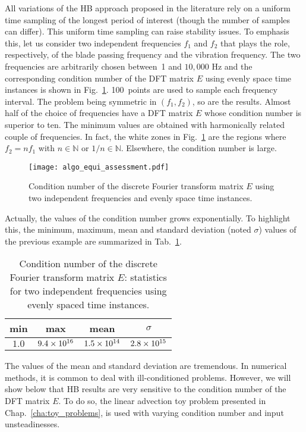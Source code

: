 All variations of the HB approach proposed in the literature rely on 
a uniform time sampling of the longest period of interest 
(though the number of samples can differ). 
This uniform time sampling can raise stability issues.
To emphasis this, let us consider two independent frequencies $f_1$
and $f_2$ that plays the role, respectively, of the blade passing frequency and
the vibration frequency. The two frequencies are arbitrarily chosen between~1
and $10,000$ Hz and the corresponding
condition number of the DFT matrix $E$
using evenly space time instances is shown in Fig.~\ref{fig:algo_equi_assessment}.
100~points are used to sample each frequency interval.
The problem being symmetric in $(f_1, f_2)$, so are the results.
Almost half of the choice of frequencies have a DFT matrix $E$
whose condition number is superior to ten.
The minimum values are obtained with harmonically related couple
of frequencies. In fact, the white zones in Fig.~\ref{fig:algo_equi_assessment}
are the regions where $f_2 = n f_1$ with $n \in \mathbb{N}$ or $1/n \in \mathbb{N}$.
Elsewhere, the condition number is large. 
\begin{figure}[htb]
  \centering
  \texttt{[image: algo\_equi\_assessment.pdf]}
  \caption{Condition number of the discrete Fourier transform matrix $E$
  using two independent frequencies and evenly space time instances.}
  \label{fig:algo_equi_assessment}
\end{figure}

Actually, the values of the condition number grows exponentially.
To highlight this, the minimum, maximum, mean and 
standard deviation (noted $\sigma$) values of the
previous example are summarized in Tab.~\ref{tab:hb_algo_equi}.
\begin{table}[htb]
  \centering
  \begin{tabular}{cccc}
    \toprule
    min & max & mean & $\sigma$ \\
    \midrule
    $1.0$ & $9.4\times 10^{16}$ & $1.5\times 10^{14}$ & $2.8\times 10^{15}$ \\
    \bottomrule
  \end{tabular}
  \caption{Condition number of the discrete Fourier transform matrix $E$: 
  statistics for two independent frequencies using evenly spaced time instances.}
  \label{tab:hb_algo_equi}
\end{table}  
The values of the mean and standard deviation are tremendous.
In numerical methods, it is common to deal with ill-conditioned
problems. However, we will show below that HB results are 
very sensitive to the condition number of the DFT matrix $E$.
To do so, the linear advection toy problem
presented in Chap.~\ref{cha:toy_problems},
is used with varying condition number and input unsteadinesses.
